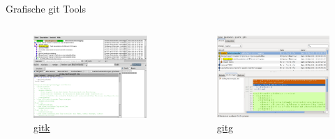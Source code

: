 \begin{frame}[allowframebreaks]{Grafische git Tools}
  \begin{columns}
    \begin{column}{0.56\textwidth}
      \begin{figure}
        \includegraphics[width=\textwidth]{img/gitk}
        \caption{\href{http://www.kernel.org/pub/software/scm/git/docs/gitk.html}{gitk}}
      \end{figure}
    \end{column}
    \begin{column}{0.56\textwidth}
      \begin{figure}
        \includegraphics[width=\textwidth]{img/gitg}
        \caption{\href{http://trac.novowork.com/gitg}{gitg}}
      \end{figure}
    \end{column}
  \end{columns}


\end{frame}
